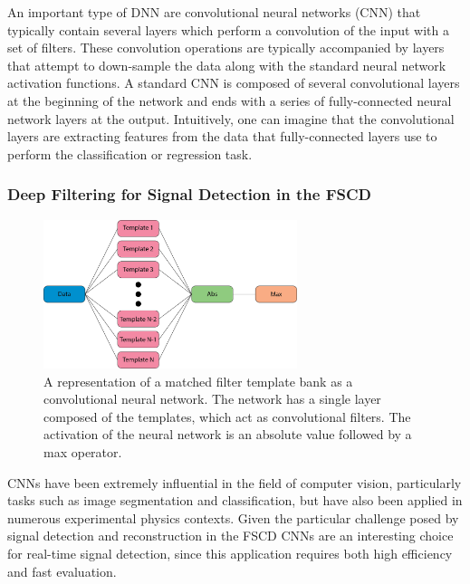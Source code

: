 An important type of DNN are convolutional neural networks (CNN) that typically contain several layers which perform a convolution of the input with a set of filters. These convolution operations are typically accompanied by layers that attempt to down-sample the data along with the standard neural network activation functions. A standard CNN is composed of several convolutional layers at the beginning of the network and ends with a series of fully-connected neural network layers at the output. Intuitively, one can imagine that the convolutional layers are extracting features from the data that fully-connected layers use to perform the classification or regression task.

\subsubsection*{Deep Filtering for Signal Detection in the FSCD}

\begin{figure}[htbp]
    \centering
    \includegraphics[width=0.66\textwidth]{figs/Chapter-4/230517_mf_conv_net.png}
    \caption{A representation of a matched filter template bank as a convolutional neural network. The network has a single layer composed of the templates, which act as convolutional filters. The activation of the neural network is an absolute value followed by a max operator.}
    \label{fig:chap4-mf-neural-network}
\end{figure}

CNNs have been extremely influential in the field of computer vision, particularly tasks such as image segmentation and classification, but have also been applied in numerous experimental physics contexts. Given the particular challenge posed by signal detection and reconstruction in the FSCD CNNs are an interesting choice for real-time signal detection, since this application requires both high efficiency and fast evaluation.

